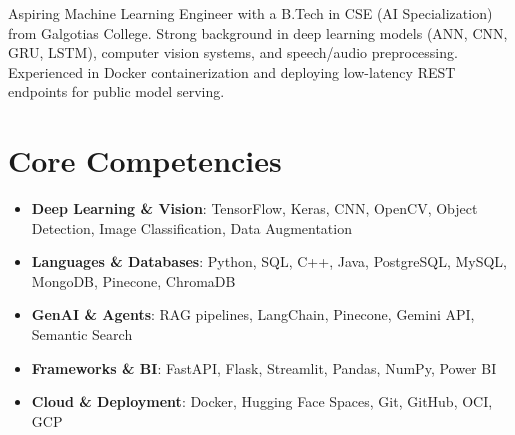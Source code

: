 \documentclass[11pt,a4paper,sans]{moderncv}
\begin{document}
\makecvtitle

\vspace{6pt}
\small{Aspiring Machine Learning Engineer with a B.Tech in CSE (AI Specialization) from Galgotias College. Strong background in deep learning models (ANN, CNN, GRU, LSTM), computer vision systems, and speech/audio preprocessing. Experienced in Docker containerization and deploying low-latency REST endpoints for public model serving.}

\section{Core Competencies}
\vspace{1pt}
\begin{itemize}
\item \textbf{Deep Learning \& Vision}: TensorFlow, Keras, CNN, OpenCV, Object Detection, Image Classification, Data Augmentation
\item \textbf{Languages \& Databases}: Python, SQL, C++, Java, PostgreSQL, MySQL, MongoDB, Pinecone, ChromaDB
\item \textbf{GenAI \& Agents}: RAG pipelines, LangChain, Pinecone, Gemini API, Semantic Search
\item \textbf{Frameworks \& BI}: FastAPI, Flask, Streamlit, Pandas, NumPy, Power BI
\item \textbf{Cloud \& Deployment}: Docker, Hugging Face Spaces, Git, GitHub, OCI, GCP
\end{itemize}
\end{document}
